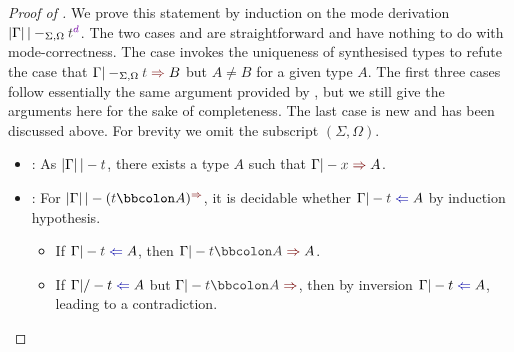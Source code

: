\begin{proof}[Proof of {}]
  We prove this statement by induction on the mode derivation\/ $\erase{\Gamma} |-_{\Sigma, \Omega} \isTerm{t}^{\dir{d}}$.
  The two cases  and  are straightforward and have nothing to do with mode-correctness.
  The case  invokes the uniqueness of synthesised types to refute the case that $\Gamma |-_{\Sigma, \Omega} \isTerm{t} \syn B$ but $A \neq B$ for a given type $A$.
  The first three cases follow essentially the same argument provided by \citet{Wadler2022}, but we still give the arguments here for the sake of completeness.
  The last case  is new and has been discussed above.
  For brevity we omit the subscript $(\Sigma, \Omega)$.
  \begin{itemize}
    \item {}: As $\erase{\Gamma} |- \isTerm{t}$, there exists a type $A$ such that $\Gamma |- \isTerm{x} \syn A$.

    \item {}: For $\erase{\Gamma} |- (\isTerm{t} \annotate A)^{\syn}$, it is decidable whether $\Gamma |- \isTerm{t} \chk A$ by induction hypothesis.
      \begin{itemize}
        \item If $\Gamma |- \isTerm{t} \chk A$, then $\Gamma |- \isTerm{t \annotate A} \syn A$.
        \item If $\Gamma |/- t \chk A$ but $\Gamma |- \isTerm{t \annotate A} \syn$, then by inversion $\Gamma |- t \chk A$, leading to a contradiction.
      \end{itemize}
      

\end{itemize}
\end{proof}
